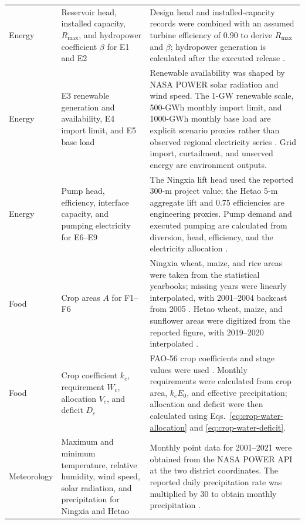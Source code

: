 \documentclass [a4paper,fleqn] {cas-dc}
\begin{document}
\begin{table}[t]
\begin{tabularx}{\textwidth}{@{}>{\raggedright\arraybackslash}p{}
  >{\raggedright\arraybackslash}p{}
  >{\raggedright\arraybackslash}X@{}}
Energy & Reservoir head, installed capacity, $R_{\max}$, and hydropower
coefficient $\beta$ for E1 and E2 & Design head and installed-capacity records
were combined with an assumed turbine efficiency of 0.90 to derive $R_{\max}$
and $\beta$; hydropower generation is calculated after the executed release
\citep{LongyangxiaNEA2018,Zhang2021Longyangxia,Yin2021YellowRiver}. \\

Energy & E3 renewable generation and availability, E4 import limit, and E5
base load & Renewable availability was shaped by NASA POWER solar radiation and
wind speed. The 1-GW renewable scale, 500-GWh monthly import limit, and
1000-GWh monthly base load are explicit scenario proxies rather than observed
regional electricity series \citep{NASAPOWER}. Grid import, curtailment, and
unserved energy are environment outputs. \\

Energy & Pump head, efficiency, interface capacity, and pumping electricity for
E6--E9 & The Ningxia lift head used the reported 300-m project value; the Hetao
5-m aggregate lift and 0.75 efficiencies are engineering proxies. Pump demand
and executed pumping are calculated from diversion, head, efficiency, and the
electricity allocation \citep{Hongsibu2025Pumping,Liao2022CanalScheduling}. \\

Food & Crop areas $A$ for F1--F6 & Ningxia wheat, maize, and rice areas were
taken from the statistical yearbooks; missing years were linearly interpolated,
with 2001--2004 backcast from 2005 \citep{NingxiaStatisticalYearbooks}. Hetao
wheat, maize, and sunflower areas were digitized from the reported figure, with
2019--2020 interpolated \citep{Feng2025Hetao}. \\

Food & Crop coefficient $k_c$, requirement $W_c$, allocation $V_c$, and deficit
$D_c$ & FAO-56 crop coefficients and stage values were used
\citep{Allen1998FAO56}. Monthly requirements were calculated from crop area,
$k_c E_0$, and effective precipitation; allocation and deficit were then
calculated using Eqs.~\eqref{eq:crop-water-allocation} and
\eqref{eq:crop-water-deficit}. \\

Meteorology & Maximum and minimum temperature, relative humidity, wind speed,
solar radiation, and precipitation for Ningxia and Hetao & Monthly point data
for 2001--2021 were obtained from the NASA POWER API at the two district
coordinates. The reported daily precipitation rate was multiplied by 30 to
obtain monthly precipitation \citep{NASAPOWER}. \\


\end{tabularx}
\end{table}
\end{document}
